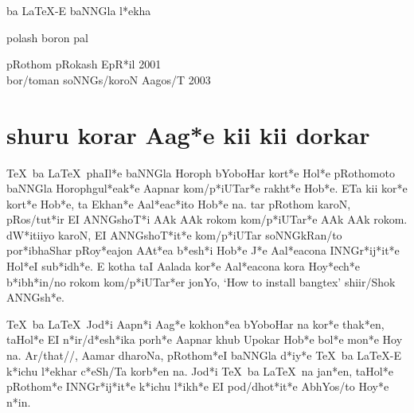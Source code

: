 \documentclass[12pt]{barticle}
\def\tex{{\rm\TeX}}
\def\latex{{\rm\LaTeX}}
\begin{document}
\bng
\begin{titlepage}
\begin{center}

{\Lbng {\Large \tex} ba {\Large \latex}-E  baNNGla \*l*ekha}

\vfill

{\lbng polash boron pal}

\vfill\vfill

pRothom pRokash E\*pR*il 2001 \\ 
bor/toman soNNGs/koroN Aagos/T 2003

\end{center}
\end{titlepage}
\setcounter{page}{2}


\tableofcontents

\newpage

\section{shuru korar Aa\*g*e kii kii dorkar}
\tex\ ba \latex\ phaI\*l*e baNNGla Horoph bYoboHar kor\*t*e Ho\*l*e
pRothomoto baNNGla Horophgu\*l*ea\*k*e Aapnar ko\*m/p*iUTa\*r*e
rakh\*t*e Ho\*b*e. ETa kii ko\*r*e kor\*t*e Ho\*b*e, ta Ekha\*n*e
Aa\*l*ea\*c*ito Ho\*b*e na. tar pRothom karoN, pRos/tu\*t*ir EI
ANNGsho\*T*i AAk AAk rokom ko\*m/p*iUTa\*r*e AAk AAk
rokom. \*dW*itiiyo karoN, EI ANNGsho\*T*i\*t*e ko\*m/p*iUTar
soNNGkRan/to po\*r*ibhaShar pRo\*y*eajon AA\*t*ea \*b*e\*sh*i Ho\*b*e
\*J*e Aa\*l*eacona INNG\*r*i\*j*i\*t*e Ho\*l*eI su\*b*i\*dh*e. E kotha
taI Aalada ko\*r*e Aa\*l*eacona kora Ho\*y*e\*ch*e \*b*i\*bh*in/no
rokom ko\*m/p*iUTa\*r*er jonYo, {\rm `How to install bangtex'}
shiir/Shok ANNG\*sh*e.

\tex\ ba \latex\ Jo\*d*i Aap\*n*i Aa\*g*e kokho\*n*ea bYoboHar na
ko\*r*e tha\*k*en, taHo\*l*e EI \*n*i\*r/d*e\*sh*ika po\*rh*e Aapnar
khub Upokar Ho\*b*e bo\*l*e mo\*n*e Hoy na. Ar/that//, Aamar dharoNa,
pRotho\*m*eI baNNGla \*d*i\*y*e \tex\ ba \latex-E \*k*ichu \*l*ekhar
\*c*eSh/Ta kor\*b*en na. Jo\*d*i \tex\ ba \latex\ na ja\*n*en,
taHo\*l*e pRotho\*m*e INNG\*r*i\*j*i\*t*e \*k*ichu \*l*i\*kh*e EI
pod/dho\*t*i\*t*e AbhYos/to Ho\*y*e \*n*in.


\end{document}

